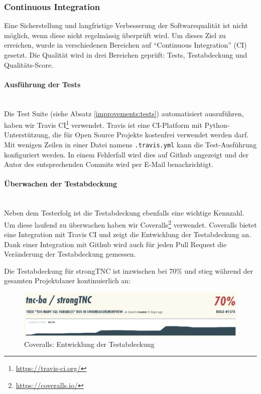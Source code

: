 \subsubsection{Continuous Integration}

Eine Sicherstellung und langfristige Verbesserung der Softwarequalität ist nicht
möglich, wenn diese nicht regelmässig überprüft wird. Um dieses Ziel zu
erreichen, wurde in verschiedenen Bereichen auf \enquote{Continuous
Integration} (CI) gesetzt. Die Qualität wird in drei Bereichen geprüft: Tests,
Testabdeckung und Qualitäts-Score.

\paragraph{Ausführung der Tests} \hspace{0pt} \\
Die Test Suite (siehe Absatz \ref{improvements:tests}) automatisiert
auszuführen, haben wir Travis CI\footnote{\url{https://travis-ci.org/}}
verwendet. Travis ist eine CI-Platform mit Python-Unterstützung, die für Open
Source Projekte kostenfrei verwendet werden darf. Mit wenigen Zeilen in einer
Datei namens \texttt{.travis.yml} kann die Test-Ausführung konfiguriert werden.
In einem Fehlerfall wird dies auf Github angezeigt und der Autor des
entsprechenden Commits wird per E-Mail benachrichtigt.

\paragraph{Überwachen der Testabdeckung} \hspace{0pt} \\
Neben dem Testerfolg ist die Testabdeckung ebenfalls eine wichtige Kennzahl. Um
diese laufend zu überwachen haben wir
Coveralls\footnote{\url{https://coveralls.io/}} verwendet. Coveralls bietet eine
Integration mit Travis CI und zeigt die Entwicklung der Testabdeckung an. Dank
einer Integration mit Github wird auch für jeden Pull Request die Veränderung
der Testabdeckung gemessen.

Die Testabdeckung für strongTNC ist inzwischen bei 70\% und stieg während der
gesamten Projektdauer kontinuierlich an:

\begin{figure}[H]
	\centering
	\includegraphics[width=\textwidth]{images/coveralls}
	\caption{Coveralls: Entwicklung der Testabdeckung}
	\label{improvements:coveralls}
\end{figure}

